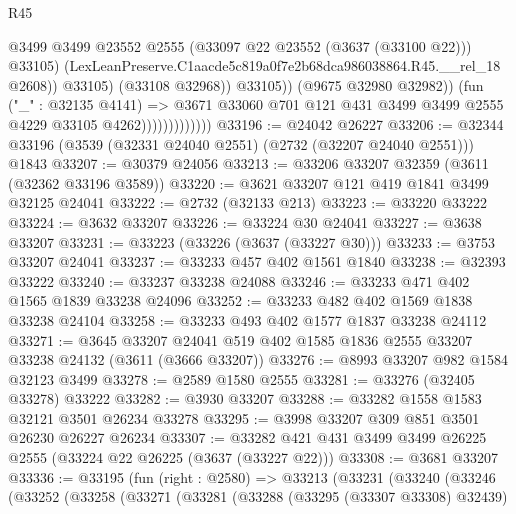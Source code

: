 \begin{lexlean}{R45}
\begin{coremodule}
                                          @3499
                                          @3499
                                          @23552
                                          @2555
                                          (@33097 @22 @23552 (@3637 (@33100 @22)))
                                          @33105)
                                        (LexLeanPreserve.C1aacde5c819a0f7e2b68dca986038864.R45.__rel_18
                                          @2608))
                                      @33105)
                                    (@33108 @32968))
                                  @33105))
                              (@9675 @32980 @32982))
                            (fun ("_" : @32135 @4141) =>
                            @3671
                              @33060
                              @701
                              @121
                              @431
                              @3499
                              @3499
                              @2555
                              @4229
                              @33105
                              @4262)))))))))))))
@33196 := @24042 @26227
@33206 := @32344 @33196 (@3539 (@32331 @24040 @2551) (@2732 (@32207 @24040 @2551))) @1843
@33207 := @30379 @24056
@33213 := @33206 @33207 @32359 (@3611 (@32362 @33196 @3589))
@33220 := @3621 @33207 @121 @419 @1841 @3499 @32125 @24041
@33222 := @2732 (@32133 @213)
@33223 := @33220 @33222
@33224 := @3632 @33207
@33226 := @33224 @30 @24041
@33227 := @3638 @33207
@33231 := @33223 (@33226 (@3637 (@33227 @30)))
@33233 := @3753 @33207 @24041
@33237 := @33233 @457 @402 @1561 @1840
@33238 := @32393 @33222
@33240 := @33237 @33238 @24088
@33246 := @33233 @471 @402 @1565 @1839 @33238 @24096
@33252 := @33233 @482 @402 @1569 @1838 @33238 @24104
@33258 := @33233 @493 @402 @1577 @1837 @33238 @24112
@33271 := @3645
    @33207
    @24041
    @519
    @402
    @1585
    @1836
    @2555
    @33207
    @33238
    @24132
    (@3611 (@3666 @33207))
@33276 := @8993 @33207 @982 @1584 @32123 @3499
@33278 := @2589 @1580 @2555
@33281 := @33276 (@32405 @33278) @33222
@33282 := @3930 @33207
@33288 := @33282 @1558 @1583 @32121 @3501 @26234 @33278
@33295 := @3998 @33207 @309 @851 @3501 @26230 @26227 @26234
@33307 := @33282 @421 @431 @3499 @3499 @26225 @2555 (@33224 @22 @26225 (@3637 (@33227 @22)))
@33308 := @3681 @33207
@33336 := @33195
    (fun (right : @2580) =>
    @33213
      (@33231
        (@33240
          (@33246
            (@33252
              (@33258
                (@33271
                  (@33281
                    (@33288
                      (@33295 (@33307 @33308) @32439)

\end{coremodule}
\end{lexlean}
